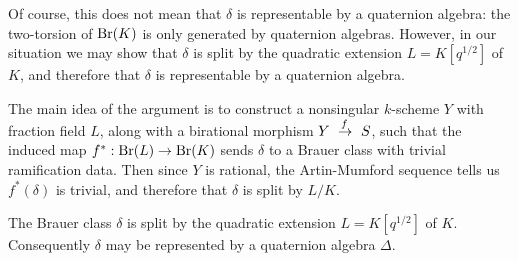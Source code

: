 Of course, this does not mean that $\delta$ is representable by a quaternion algebra: the two-torsion of $\textnormal{Br}(K)$ is only generated by quaternion algebras.  However, in our situation we may show that $\delta$ is split by the quadratic extension $L=K[q^{1/2}]$ of $K$, and therefore that $\delta$ is representable by a quaternion algebra.

The main idea of the argument is to construct a nonsingular $k$-scheme $Y$ with fraction field $L$, along with a birational morphism $Y\xdashrightarrow{f} S$, such that the induced map $f^*: \textnormal{Br}(L)\rightarrow\textnormal{Br}(K)$ sends $\delta$ to a Brauer class with trivial ramification data.  Then since $Y$ is rational, the Artin-Mumford sequence tells us $f^*(\delta)$ is trivial, and therefore that $\delta$ is split by $L/K$.
\begin{prop}
The Brauer class $\delta$ is split by the quadratic extension $L = K[q^{1/2}]$ of $K$.  Consequently $\delta$ may be represented by a quaternion algebra $\Delta$.
\end{prop}
